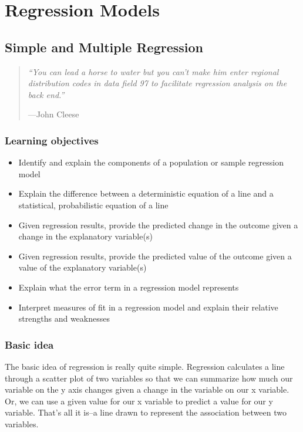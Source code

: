 \documentclass[
]{book}
\providecommand{\tightlist}{%
  \setlength{\itemsep}{0pt}\setlength{\parskip}{0pt}}
\begin{document}
\hypertarget{part-regression-models}{%
\part{Regression Models}\label{part-regression-models}}

\hypertarget{simple-and-multiple-regression}{%
\chapter{Simple and Multiple Regression}\label{simple-and-multiple-regression}}

\begin{quote}
\emph{``You can lead a horse to water but you can't make him enter regional distribution codes in data field 97 to facilitate regression analysis on the back end.''}

---John Cleese
\end{quote}

\hypertarget{lo6}{%
\section{Learning objectives}\label{lo6}}

\begin{itemize}
\tightlist
\item
  Identify and explain the components of a population or sample regression model
\item
  Explain the difference between a deterministic equation of a line and a statistical, probabilistic equation of a line
\item
  Given regression results, provide the predicted change in the outcome given a change in the explanatory variable(s)
\item
  Given regression results, provide the predicted value of the outcome given a value of the explanatory variable(s)
\item
  Explain what the error term in a regression model represents
\item
  Interpret measures of fit in a regression model and explain their relative strengths and weaknesses
\end{itemize}

\hypertarget{basic-idea}{%
\section{Basic idea}\label{basic-idea}}

The basic idea of regression is really quite simple. Regression calculates a line through a scatter plot of two variables so that we can summarize how much our variable on the y axis changes given a change in the variable on our x variable. Or, we can use a given value for our x variable to predict a value for our y variable. That's all it is--a line drawn to represent the association between two variables.
\end{document}
